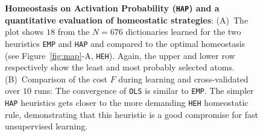 \documentclass[vision,article,submit,oneauthor,pdftex]{Definitions/mdpi}
\newcommand{\seeFig}[1]{Figure~\ref{fig:#1}}%
\begin{document}
\begin{figure}%
\caption{
{\bf Homeostasis on Activation Probability (\texttt{HAP}) and a quantitative evaluation of homeostatic strategies}: %
 {\sf (A)}~The plot shows $18$ from the $N=676$ dictionaries learned for the two heuristics \texttt{EMP} and \texttt{HAP} and compared to the optimal homeostasis (see \seeFig{map}-A, \texttt{HEH}).
 Again, the upper and lower row respectively show the least and most probably selected atoms. {\sf (B)}~Comparison of the cost $F$ during learning and cross-validated over $10$ runs: The convergence of \texttt{OLS} is similar to \texttt{EMP}. The simpler \texttt{HAP} heuristics gets closer to the more demanding \texttt{HEH} homeostatic rule, demonstrating that this heuristic is a good compromise for fast unsupervised learning.
\label{fig:HAP}}%
\end{figure}%
\end{document}
